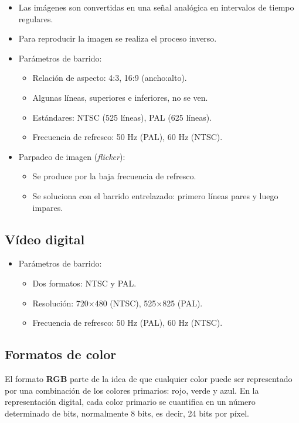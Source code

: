 \documentclass[11pt,a4paper]{article}
\begin{document}
\begin{itemize}
	\item Las imágenes son convertidas en una señal analógica en intervalos de tiempo regulares.
	\item Para reproducir la imagen se realiza el proceso inverso.
	\item Parámetros de barrido:
		\begin{itemize}
			\item Relación de aspecto: 4:3, 16:9 (ancho:alto).
			\item Algunas líneas, superiores e inferiores, no se ven.
			\item Estándares: NTSC (525 líneas), PAL (625 líneas).
			\item Frecuencia de refresco: 50 Hz (PAL), 60 Hz (NTSC).
		\end{itemize}
	\item Parpadeo de imagen (\textit{flicker}):
		\begin{itemize}
			\item Se produce por la baja frecuencia de refresco.
			\item Se soluciona con el barrido entrelazado: primero líneas pares y luego impares.
		\end{itemize}
\end{itemize}

\subsection{Vídeo digital}

\begin{itemize}
	\item Parámetros de barrido:
	\begin{itemize}
		\item Dos formatos: NTSC y PAL.
		\item Resolución: 720$\times$480 (NTSC), 525$\times$825 (PAL).
		\item Frecuencia de refresco: 50 Hz (PAL), 60 Hz (NTSC).
	\end{itemize}
\end{itemize}

\subsection{Formatos de color}

El formato \textbf{RGB} parte de la idea de que cualquier color puede ser representado por una combinación de los colores primarios: rojo, verde y azul.
En la representación digital, cada color primario se cuantifica en un número determinado de bits, normalmente 8 bits, es decir, 24 bits por píxel.
\end{document}
